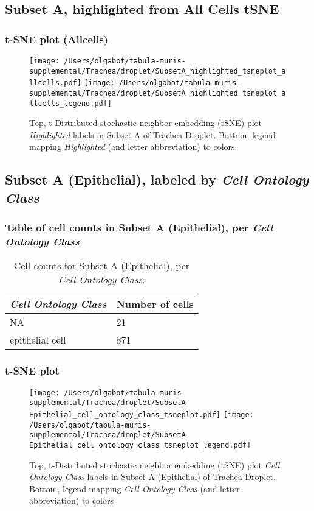 \clearpage

\subsection{Subset A, highlighted from All Cells tSNE}

\subsubsection{t-SNE plot (Allcells)}
\begin{figure}[h]
\centering
\texttt{[image: /Users/olgabot/tabula-muris-supplemental/Trachea/droplet/SubsetA\_highlighted\_tsneplot\_allcells.pdf]}
\texttt{[image: /Users/olgabot/tabula-muris-supplemental/Trachea/droplet/SubsetA\_highlighted\_tsneplot\_allcells\_legend.pdf]}
\caption{Top, t-Distributed stochastic neighbor embedding (tSNE) plot  \emph{Highlighted} labels in Subset A of Trachea Droplet. Bottom, legend mapping \emph{Highlighted} (and letter abbreviation) to colors}
\end{figure}


\clearpage

\subsection{Subset A (Epithelial), labeled by \emph{Cell Ontology Class}}
\subsubsection{Table of cell counts in Subset A (Epithelial), per \emph{Cell Ontology Class}}\begin{table}[h]
\centering
\label{my-label}
\begin{tabular}{@{}ll@{}}
\toprule

\emph{Cell Ontology Class}& Number of cells \\ \midrule
NA & 21 \\

epithelial cell & 871 \\
\bottomrule
\end{tabular}
\caption{Cell counts for Subset A (Epithelial), per \emph{Cell Ontology Class}.}
\end{table}

\clearpage
\subsubsection{t-SNE plot}
\begin{figure}[h]
\centering
\texttt{[image: /Users/olgabot/tabula-muris-supplemental/Trachea/droplet/SubsetA-Epithelial\_cell\_ontology\_class\_tsneplot.pdf]}
\texttt{[image: /Users/olgabot/tabula-muris-supplemental/Trachea/droplet/SubsetA-Epithelial\_cell\_ontology\_class\_tsneplot\_legend.pdf]}
\caption{Top, t-Distributed stochastic neighbor embedding (tSNE) plot  \emph{Cell Ontology Class} labels in Subset A (Epithelial) of Trachea Droplet. Bottom, legend mapping \emph{Cell Ontology Class} (and letter abbreviation) to colors}
\end{figure}


